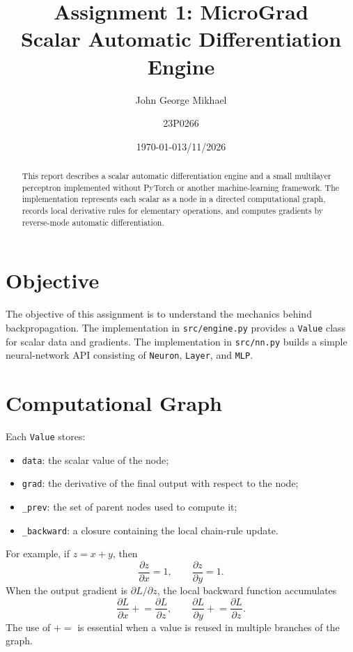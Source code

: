 \documentclass[11pt,a4paper]{article}
\title{Assignment 1: MicroGrad\\Scalar Automatic Differentiation Engine}
\author{John George Mikhael \and 23P0266}
\date{\today 3/11/2026}
\begin{document}
\maketitle

\begin{abstract}
This report describes a scalar automatic differentiation engine and a small
multilayer perceptron implemented without PyTorch or another machine-learning
framework. The implementation represents each scalar as a node in a directed
computational graph, records local derivative rules for elementary operations,
and computes gradients by reverse-mode automatic differentiation.
\end{abstract}

\section{Objective}
The objective of this assignment is to understand the mechanics behind
backpropagation. The implementation in \texttt{src/engine.py} provides a
\texttt{Value} class for scalar data and gradients. The implementation in
\texttt{src/nn.py} builds a simple neural-network API consisting of
\texttt{Neuron}, \texttt{Layer}, and \texttt{MLP}.

\section{Computational Graph}
Each \texttt{Value} stores:
\begin{itemize}
  \item \texttt{data}: the scalar value of the node;
  \item \texttt{grad}: the derivative of the final output with respect to the
        node;
  \item \texttt{\_prev}: the set of parent nodes used to compute it;
  \item \texttt{\_backward}: a closure containing the local chain-rule update.
\end{itemize}

For example, if $z=x+y$, then
\[
\frac{\partial z}{\partial x}=1,\qquad
\frac{\partial z}{\partial y}=1.
\]
When the output gradient is $\partial L/\partial z$, the local backward
function accumulates
\[
\frac{\partial L}{\partial x}
\mathrel{+}=\frac{\partial L}{\partial z},\qquad
\frac{\partial L}{\partial y}
\mathrel{+}=\frac{\partial L}{\partial z}.
\]
The use of $\mathrel{+}=$ is essential when a value is reused in multiple
branches of the graph.
\end{document}
